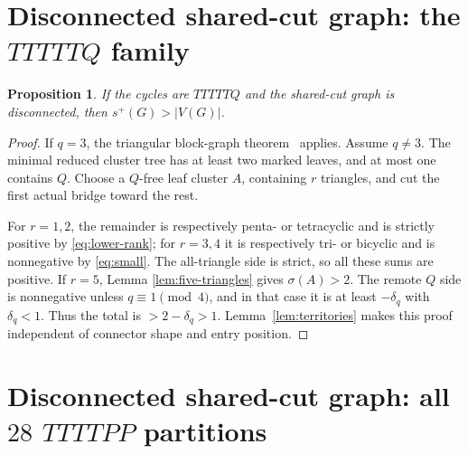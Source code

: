 \documentclass[11pt]{article}
\newtheorem{proposition}[theorem]{Proposition}
\newcommand{\spE}{s^+}
\newcommand{\sig}{\sigma}
\begin{document}
\section{Disconnected shared-cut graph: the $TTTTTQ$ family}

\begin{proposition}\label{prop:disconnected-tttttq}
If the cycles are $TTTTTQ$ and the shared-cut graph is disconnected, then
$\spE(G)>|V(G)|$.
\end{proposition}

\begin{proof}
If $q=3$, the triangular block-graph theorem~\cite{PackingTwo} applies.  Assume
$q\ne3$.  The minimal reduced cluster tree has at least two marked leaves, and
at most one contains $Q$.  Choose a $Q$-free leaf cluster $A$, containing $r$
triangles, and cut the first actual bridge toward the rest.

For $r=1,2$, the remainder is respectively penta- or tetracyclic and is
strictly positive by \eqref{eq:lower-rank}; for $r=3,4$ it is respectively
tri- or bicyclic and is nonnegative by \eqref{eq:small}.  The all-triangle side
is strict, so all these sums are positive.  If $r=5$, Lemma
\ref{lem:five-triangles} gives $\sig(A)>2$.  The remote $Q$ side is
nonnegative unless $q\equiv1\pmod4$, and in that case it is at least
$-\delta_q$ with $\delta_q<1$.  Thus the total is $>2-\delta_q>1$.
Lemma~\ref{lem:territories} makes this proof independent of connector shape and
entry position.
\end{proof}

\section{Disconnected shared-cut graph: all $28$ $TTTTPP$ partitions}
\end{document}
